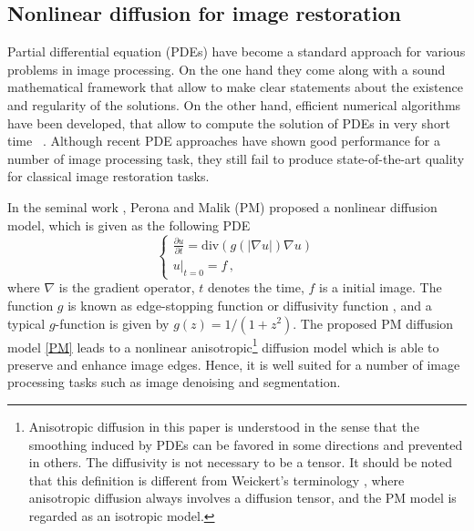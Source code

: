 \documentclass[10pt,journal,compsoc]{IEEEtran}
\begin{document}
\subsection{Nonlinear diffusion for image restoration}\label{intro} {
  Partial differential equation (PDEs) have become a standard approach
  for various problems in image processing. On the one hand they come
  along with a sound mathematical framework that allow to make clear
  statements about the existence and regularity of the solutions. On
  the other hand, efficient numerical algorithms have been developed,
  that allow to compute the solution of PDEs in very short
  time~\cite{PMmodel, anisotropicbook} . Although recent PDE approaches
  have shown good performance for a number of image processing task,
  they still fail to produce state-of-the-art quality for classical
  image restoration tasks.

\begin{comment}
Unfortunately, the image restoration quality of diffusion based approaches is usually 
far away from state-of-the-art algorithms for specific tasks, 
even though many improvements
\cite{hajiaboli2011anisotropic, 
didas2009properties, guidotti2011two}.
We give a brief review of nonlinear diffusion based approaches and then introduce our proposed diffusion model. 
\end{comment}
In the seminal work \cite{PMmodel}, Perona and Malik (PM) proposed a 
nonlinear diffusion model, which is given as the following PDE
\begin{equation}\label{PM}
\begin{cases}
{\frac{\partial u}{\partial t} = \text{div} (g(|\nabla u|) \nabla u)}\\
u \big|_{t = 0} = f \,, 
\end{cases}
\end{equation}
{where $\nabla$ is the gradient operator, $t$ denotes the time, $f$ is 
  a initial image.} The function $g$ is known as edge-stopping function
\cite{ROBUSTANISOTROPIC} or diffusivity function \cite{anisotropicbook}, and 
a typical $g$-function is given by $g(z) ={1}/{(1+z^2)}$. 
The proposed PM diffusion model \eqref{PM} leads to a 
nonlinear anisotropic\footnote{
  Anisotropic diffusion in this paper is understood in the sense that 
  the smoothing induced by PDEs can be favored in some directions and 
  prevented in others. The diffusivity is not 
  necessary to be a tensor. It should be noted that this definition is different from Weickert's terminology \cite{anisotropicbook}, 
  where anisotropic diffusion always involves a diffusion tensor, and the PM model is regarded as an isotropic model.}
diffusion model which is able to preserve and enhance image edges.
Hence, it is well suited for a number of image processing tasks such as image denoising and segmentation. 

}
\end{document}
